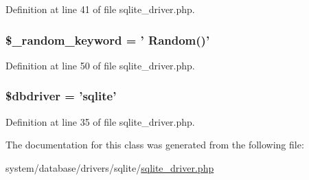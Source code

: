 Definition at line 41 of file sqlite\-\_\-driver.\-php.

\hypertarget{class_c_i___d_b__sqlite__driver_a10213aa6e05f6d924d3277bb1d2fea00}{
\subsubsection[{\$\-\_\-random\-\_\-keyword}]{\setlength{\rightskip}{0pt plus 5cm}\$\-\_\-random\-\_\-keyword = ' Random()'}}\label{class_c_i___d_b__sqlite__driver_a10213aa6e05f6d924d3277bb1d2fea00}


Definition at line 50 of file sqlite\-\_\-driver.\-php.

\hypertarget{class_c_i___d_b__sqlite__driver_a0cde2a16322a023d040aa7f725877597}{
\subsubsection[{\$dbdriver}]{\setlength{\rightskip}{0pt plus 5cm}\$dbdriver = 'sqlite'}}\label{class_c_i___d_b__sqlite__driver_a0cde2a16322a023d040aa7f725877597}


Definition at line 35 of file sqlite\-\_\-driver.\-php.



The documentation for this class was generated from the following file\-:\begin{DoxyCompactItemize}
\item 
system/database/drivers/sqlite/\hyperlink{sqlite__driver_8php}{sqlite\-\_\-driver.\-php}\end{DoxyCompactItemize}
